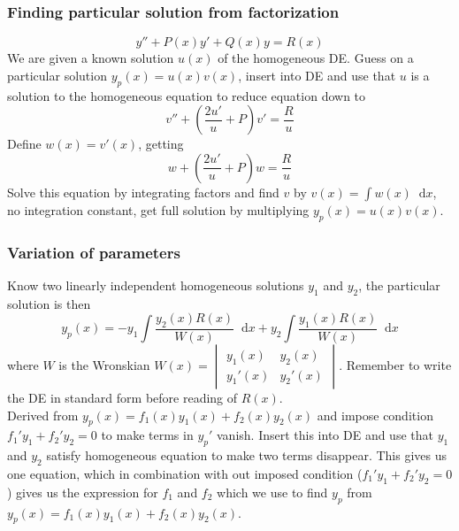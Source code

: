 \documentclass[a4paper, 10pt]{article}
\newcommand*\diff{\mathop{}\!\mathrm{d}}
\begin{document}
\begin{multicols*}{3}
\subsubsection*{\small Finding particular solution from factorization}
$$y'' + P(x)y' + Q(x)y = R(x)$$
We are given a known solution $u(x)$ of the homogeneous DE. Guess on a particular solution $y_p(x) = u(x)v(x)$, insert into DE and use that $u$ is a solution to the homogeneous equation to reduce equation down to
$$ v'' + \left(\frac{2u'}{u}+P\right)v' = \frac{R}{u}$$
Define $w(x)=v'(x)$, getting
$$ w + \left(\frac{2u'}{u}+P\right)w = \frac{R}{u}$$
Solve this equation by integrating factors and find $v$ by $v(x) = \int w(x) \diff x$, no integration constant, get full solution by multiplying $y_p(x) = u(x)v(x)$.

\subsubsection*{\small Variation of parameters}
Know two linearly independent homogeneous solutions $y_1$ and $y_2$, the particular solution is then
$$ y_p(x) = -y_1 \int \frac{y_2(x)R(x)}{W(x)} \diff x + y_2 \int \frac{y_1(x) R(x)}{W(x)}\diff x$$
where $W$ is the Wronskian $W(x) = \begin{vmatrix} y_1(x)  & y_2(x)\\ y_1'(x) & y_2'(x) \end{vmatrix}.$ Remember to write the DE in standard form before reading of $R(x)$. \\
Derived from $y_p(x) = f_1(x)y_1(x) + f_2(x)y_2(x)$ and impose condition $f_1'y_1 + f_2'y_2 = 0$ to make terms in $y_p'$ vanish. Insert this into DE and use that $y_1$ and $y_2$ satisfy homogeneous equation to make two terms disappear. This gives us one equation, which in combination with out imposed condition ($f_1'y_1 + f_2'y_2 = 0$) gives us the expression for $f_1$ and $f_2$ which we use to find $y_p$ from $y_p(x) = f_1(x)y_1(x) + f_2(x)y_2(x)$.


\end{multicols*}
\end{document}
